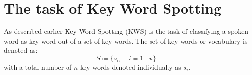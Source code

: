 
\section{The task of Key Word Spotting}\label{sec:intro_kws}
As described earlier Key Word Spotting (KWS) is the task of classifying a spoken word as key word out of a set of key words.
The set of key words or vocabulary is denoted as:
\begin{equation}\label{eq:intro_kws_dict}
	S \coloneqq \{s_i, \quad i=1 \dots n\}
\end{equation}
with a total number of $n$ key words denoted individually as $s_i$. 